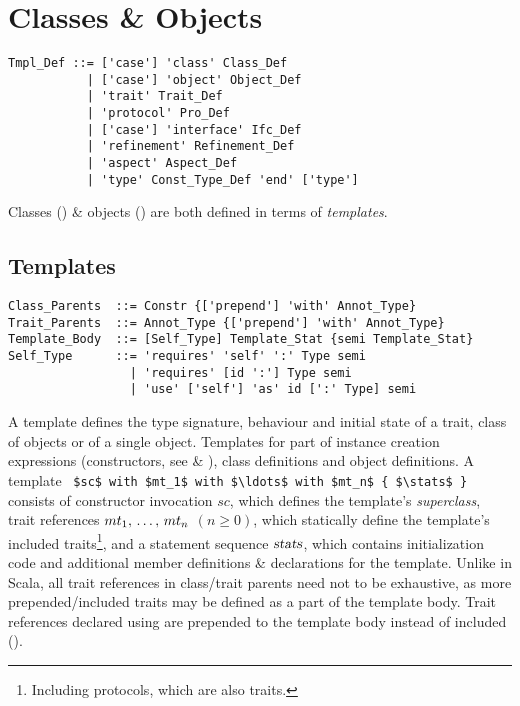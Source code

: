 
\chapter{Classes \& Objects}

\syntax\begin{lstlisting}
Tmpl_Def ::= ['case'] 'class' Class_Def
           | ['case'] 'object' Object_Def
           | 'trait' Trait_Def
           | 'protocol' Pro_Def
           | ['case'] 'interface' Ifc_Def
           | 'refinement' Refinement_Def
           | 'aspect' Aspect_Def
           | 'type' Const_Type_Def 'end' ['type']
\end{lstlisting}


Classes () \& objects () are both defined in terms of {\em templates}. 





\section{Templates}
\label{sec:templates}

\syntax\begin{lstlisting}
Class_Parents  ::= Constr {['prepend'] 'with' Annot_Type} 
Trait_Parents  ::= Annot_Type {['prepend'] 'with' Annot_Type}
Template_Body  ::= [Self_Type] Template_Stat {semi Template_Stat}
Self_Type      ::= 'requires' 'self' ':' Type semi
                 | 'requires' [id ':'] Type semi
                 | 'use' ['self'] 'as' id [':' Type] semi
\end{lstlisting}

A template defines the type signature, behaviour and initial state of a trait, class of objects or of a single object. Templates for part of instance creation expressions (constructors, see  \& ), class definitions and object definitions. A template ~\lstinline!$sc$ with $mt_1$ with $\ldots$ with $mt_n$ { $\stats$ }!~ consists of constructor invocation $sc$, which defines the template's {\em superclass}, trait references $mt_1 ,\, \ldots ,\, mt_n$ $(n \geq 0)$, which statically define the template's included traits\footnote{Including protocols, which are also traits.}, and a statement sequence $\mbox{\sl stats}$, which contains initialization code and additional member definitions \& declarations for the template. Unlike in Scala, all trait references in class/trait parents need not to be exhaustive, as more prepended/included traits may be defined as a part of the template body. Trait references declared using  are prepended to the template body instead of included (). 


